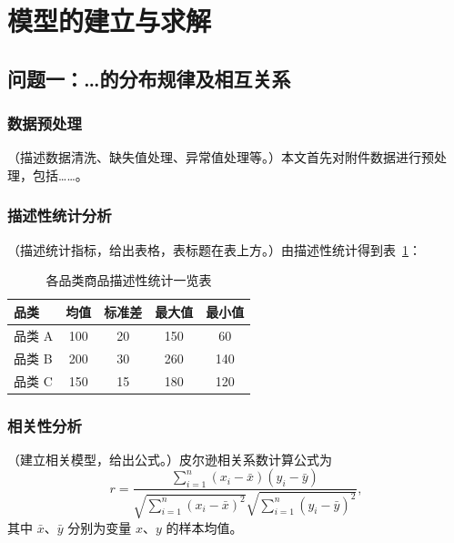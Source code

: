 \documentclass[a4paper, zihao=-4, fontset=windows]{ctexart}
\begin{document}
\section{模型的建立与求解}

\subsection{问题一：\ldots 的分布规律及相互关系}

\subsubsection{数据预处理}

（描述数据清洗、缺失值处理、异常值处理等。）本文首先对附件数据进行预处理，包括……。

\subsubsection{描述性统计分析}

（描述统计指标，给出表格，表标题在表上方。）由描述性统计得到表~\ref{tab:desc}：

\begin{table}[htbp]
  \centering
  \caption{各品类商品描述性统计一览表}
  \label{tab:desc}
  \begin{tabular}{lcccc}
    \toprule
    品类 & 均值 & 标准差 & 最大值 & 最小值 \\
    \midrule
    品类 A & 100 & 20 & 150 & 60 \\
    品类 B & 200 & 30 & 260 & 140 \\
    品类 C & 150 & 15 & 180 & 120 \\
    \bottomrule
  \end{tabular}
\end{table}

\subsubsection{相关性分析}

（建立相关模型，给出公式。）皮尔逊相关系数计算公式为
\begin{equation}
  r = \frac{\sum_{i=1}^{n}(x_i-\bar{x})(y_i-\bar{y})}
           {\sqrt{\sum_{i=1}^{n}(x_i-\bar{x})^2}\sqrt{\sum_{i=1}^{n}(y_i-\bar{y})^2}},
  \label{eq:pearson}
\end{equation}
其中 $\bar{x}$、$\bar{y}$ 分别为变量 $x$、$y$ 的样本均值。
\end{document}
